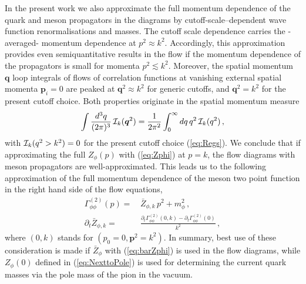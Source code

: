 \documentclass[%
reprint,
superscriptaddress,
showpacs,preprintnumbers,
 amsmath,amssymb,
 aps,
prd,
]{revtex4-1}
\def\eq#1{(\ref{#1})}
\begin{document}
In the present work we also approximate the full momentum dependence
of the quark and meson propagators in the diagrams by
cutoff-scale--dependent wave function renormalisations and masses. The
cutoff scale dependence carries the -averaged- momentum dependence at
$p^2 \approx k^2 $. Accordingly, this approximation provides even
semiquantitative results in the flow if the momentum dependence of
the propagators is small for momenta $p^2 \lesssim k^2$. Moreover, the
spatial momentum $\bm q$ loop integrals of flows of correlation
functions at vanishing external spatial momenta $\bm p_i=0$ are peaked
at $\bm q^2 \approx k^2$ for generic cutoffs, and $\bm q^2 = k^2$ for
the present cutoff choice. Both properties originate in the spatial
momentum measure
%
\begin{align}\label{eq:SpatialLoop}
  \int \frac{d^3 q}{(2 \pi)^3} \,{\cal I}_k(\bm{q}^2)=
  \frac{1}{2 \pi^2}\int_0^\infty d q\, q^2\, 
  {\cal I}_k(q^2)\,, 
\end{align}
%
with ${\cal I}_k({q}^2>k^2) =0$ for the present cutoff choice
\eq{eq:Regs}. We conclude that if approximating the full $Z_\phi(p)$
with \eq{eq:Zphi} at $p=k$, the flow diagrams with meson propagators
are well-approximated.  This leads us to the following approximation
of the full momentum dependence of the meson two point function in the
right hand side of the flow equations,
%
\begin{align}\nonumber 
  \Gamma^{(2)}_{\phi\phi} (p) =&\, \bar Z_{\phi,k} \,p^2 +
                                 m_\phi^2 \,,\\[1ex]
  \partial_t
  \bar Z_{\phi,k} =&\,\frac{\partial_t \Gamma^{(2)}_{\phi\phi} (0,k)-
                     \partial_t \Gamma^{(2)}_{\phi\phi} (0) }{k^2}\,,
\label{eq:barZphi}\end{align}
%
where $(0,k)$ stands for $(p_0=0,\bm{p}^2=k^2)$. In summary, best use
of these consideration is made if $\bar Z_\phi$ with \eq{eq:barZphi}
is used in the flow diagrams, while $Z_\phi(0)$ defined in
\eq{eq:NexttoPole} is used for determining the current quark masses
via the pole mass of the pion in the vacuum.
\end{document}
